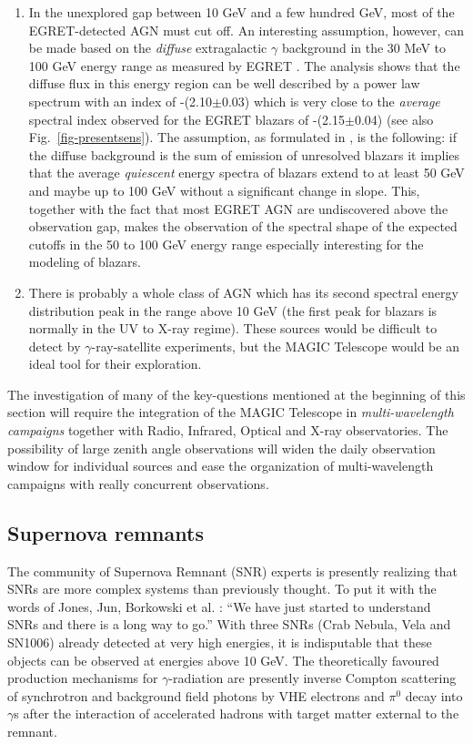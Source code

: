 \begin{enumerate}
\item  In the unexplored gap between 10 GeV and a few hundred GeV, most of the
EGRET-detected AGN must cut off.
An interesting
assumption, however,
can be made based on the {\it diffuse} extragalactic $\gamma$
background in the
30 MeV to 100 GeV energy range as measured by EGRET \cite{sreekumar:97}. 
The analysis shows that the diffuse flux in this energy
region can be well described by a power
law spectrum with an index of -(2.10$\pm$0.03) which is
very close to the {\it average} spectral index observed for the EGRET
blazars of -(2.15$\pm$0.04) \cite{montigny:95,mukherjee:97} (see also
Fig.~\ref{fig-presentsens}).
The assumption, as formulated in \cite{sreekumar:97}, is the following: 
if the diffuse background is the sum of emission of unresolved
blazars it implies that the average {\it quiescent} energy spectra of blazars
extend to at least 50 GeV and maybe up to 100 GeV without a significant change in slope.
This, together with the fact that most EGRET AGN are undiscovered above
the observation gap, makes the observation of the spectral shape of the expected
cutoffs in the 50 to 100 GeV energy range
especially interesting for the modeling of blazars.

\item  There is probably a whole class of AGN which has its second spectral
energy distribution peak in the range above 10 GeV (the first peak for
blazars is normally in the UV to X-ray regime). These sources would be
difficult to detect by $\gamma $-ray-satellite experiments, but the MAGIC
Telescope would be an ideal tool for their exploration.
\end{enumerate}

The investigation of many of the key-questions mentioned at the beginning of
this section will require the integration of the MAGIC Telescope in {\it %
multi-wavelength campaigns} together with Radio, Infrared, Optical and X-ray
observatories. The possibility of large zenith angle observations will widen
the daily observation window for individual sources and ease the
organization of multi-wavelength campaigns with really concurrent
observations.

\subsection{Supernova remnants}

\medskip The community of Supernova Remnant (SNR) experts is presently realizing that
SNRs are more complex systems than previously thought. To put it with the
words of Jones, Jun, Borkowski et al. \cite{jones:97}: ``We have just started to
understand SNRs and there is a long way to go.'' With three SNRs (Crab
Nebula, Vela and SN1006) already detected at very high energies, it is
indisputable that these objects can be observed at energies above 10 GeV.
The theoretically favoured production mechanisms 
for $\gamma$-radiation are presently inverse
Compton scattering of synchrotron and background field photons by VHE
electrons and $\pi^0$ decay into $\gamma$s after the interaction of
accelerated hadrons with target matter external to the remnant.

